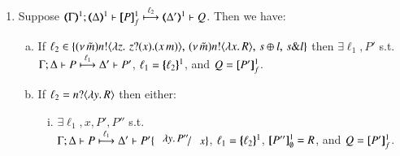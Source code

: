 \begin{proposition}
\begin{enumerate}[1.]
\begin{enumerate}[a)]
%			
%			
			\end{enumerate}
			
		\item	Suppose $\horel{\tmap{\Gamma}{1}}{\tmap{\Delta}{1}}{\pmapp{P}{1}{f}}{\hby{\ell_2}}{\tmap{\Delta'}{1}}{Q}$.
			Then we have:
%
			\begin{enumerate}[a)]
				\item 
					If $\ell_2 \in
					\{(\nu\, \tilde{m})n ! \langle \lambda z.\,\,z ? (x) . (x\, {m}) \rangle, \,(\nu\, \tilde{m}) n ! \langle \lambda x.\,R \rangle, \,s \oplus l, \,s \& l\}$
					then $\exists \ell_1, P'$ s.t. \\
					$\Gamma; \Delta \vdash P \stackrel{\ell_1}{\longmapsto} \Delta' \vdash P'$, 
					$\ell_1 = \{\!\!\{\ell_2\}\!\!\}^{1}$, 
					and
					$Q = [\!\![P']\!\!]^1_f$.
			
				\item 
					If $\ell_2 = n ? \langle \lambda y.\,R \rangle$ %
					then either:
%
					\begin{enumerate}[(i)]
						\item	$\exists \ell_1, x, P', P''$ s.t. \\
							$\horel{\Gamma}{\Delta}{P}{\hby{\ell_1}}{\Delta'}{P' \subst{\abs{y}P''}{x}}$, 
							$\ell_1 = \{\!\!\{\ell_2\}\!\!\}^{1}$, $[\!\![P'']\!\!]^1_\emptyset = R$, and $Q = [\!\![P']\!\!]^1_f$.


\end{enumerate}
\end{enumerate}
\end{enumerate}
\end{proposition}
